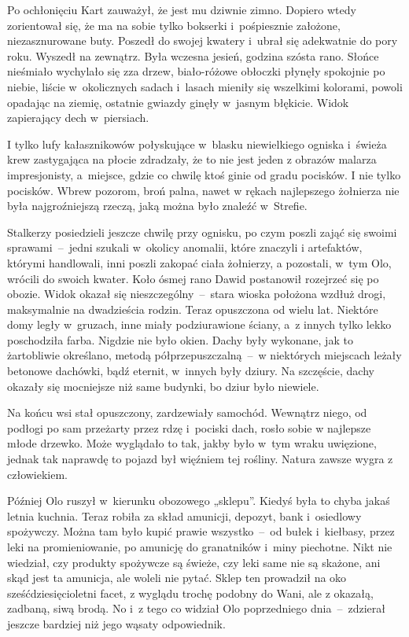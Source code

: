 \documentclass[../MAIN.tex]{subfiles}
\begin{document}
Po ochłonięciu Kart zauważył, że jest mu dziwnie zimno. Dopiero wtedy
zorientował się, że ma na sobie tylko bokserki i~pośpiesznie założone,
niezasznurowane buty. Poszedł do swojej kwatery i~ubrał się adekwatnie do pory
roku. Wyszedł na zewnątrz. Była wczesna jesień, godzina szósta rano. Słońce
nieśmiało wychylało się zza drzew, biało-różowe obłoczki płynęły spokojnie
po niebie, liście w~okolicznych sadach i~lasach mieniły się wszelkimi kolorami,
powoli opadając na ziemię, ostatnie gwiazdy ginęły w~jasnym błękicie. Widok
zapierający dech w~piersiach.

I tylko lufy kałasznikowów połyskujące w~blasku
niewielkiego ogniska i~świeża krew zastygająca na płocie zdradzały, że to nie
jest jeden z obrazów malarza impresjonisty, a~miejsce, gdzie co chwilę ktoś
ginie od gradu pocisków. I nie tylko pocisków. Wbrew pozorom, broń palna, nawet
w rękach najlepszego żołnierza nie była najgroźniejszą rzeczą, jaką można było
znaleźć w~Strefie.

Stalkerzy posiedzieli jeszcze chwilę przy ognisku, po czym poszli zająć się
swoimi sprawami~--~jedni szukali w~okolicy anomalii, które znaczyli i
artefaktów, którymi handlowali, inni poszli zakopać ciała żołnierzy, a
pozostali, w~tym Olo, wrócili do swoich kwater.
Koło ósmej rano Dawid postanowił
rozejrzeć się po obozie. Widok okazał się nieszczególny~--~stara wioska
położona wzdłuż drogi, maksymalnie na dwadzieścia rodzin. Teraz opuszczona od
wielu lat. Niektóre domy legły w~gruzach, inne miały podziurawione ściany, a~z
innych tylko lekko poschodziła farba.
Nigdzie nie było okien. Dachy były
wykonane, jak to żartobliwie określano, metodą półprzepuszczalną~--~w
niektórych miejscach leżały betonowe dachówki, bądź eternit, w~innych były
dziury. Na szczęście, dachy okazały się mocniejsze niż same budynki, bo dziur
było niewiele.

Na końcu wsi stał opuszczony, zardzewiały samochód. Wewnątrz
niego, od podłogi po sam przeżarty przez rdzę i~pociski dach, rosło sobie w
najlepsze młode drzewko. Może wyglądało to
tak,
jakby było w~tym wraku uwięzione, jednak tak naprawdę to pojazd był więźniem tej
rośliny. Natura zawsze wygra z człowiekiem.

Później Olo ruszył w~kierunku obozowego „sklepu”. Kiedyś była to chyba jakaś
letnia kuchnia. Teraz robiła za skład amunicji, depozyt, bank i~osiedlowy
spożywczy. Można tam było kupić prawie wszystko~--~od bułek i~kiełbasy, przez
leki na promieniowanie, po amunicję do granatników i~miny piechotne.
Nikt nie wiedział, czy produkty spożywcze są świeże, czy leki same nie są skażone, ani
skąd jest ta amunicja, ale woleli nie pytać. Sklep ten prowadził na oko
sześćdziesięcioletni facet, z wyglądu trochę podobny do Wani, ale z okazałą,
zadbaną, siwą brodą. No i~z tego co widział Olo poprzedniego dnia~--~zdzierał
jeszcze bardziej niż jego wąsaty odpowiednik.
\end{document}

